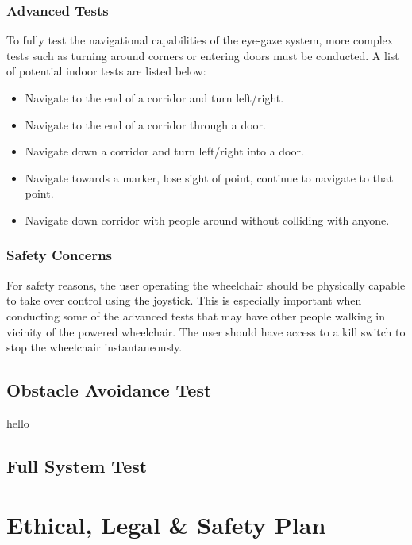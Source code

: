 \documentclass[12pt,a4paper]{report}
\begin{document}
\subsection{Advanced Tests}
To fully test the navigational capabilities of the eye-gaze system, more complex tests such as turning around corners or entering doors must be conducted. A list of potential indoor tests are listed below:

\begin{itemize}
	\item Navigate to the end of a corridor and turn left/right.
	\item Navigate to the end of a corridor through a door.
	\item Navigate down a corridor and turn left/right into a door.
	\item Navigate towards a marker, lose sight of point, continue to navigate to that point.
	\item Navigate down corridor with people around without colliding with anyone.
\end{itemize}

\subsection{Safety Concerns}
For safety reasons, the user operating the wheelchair should be physically capable to take over control using the joystick. This is especially important when conducting some of the advanced tests that may have other people walking in vicinity of the powered wheelchair. The user should have access to a kill switch to stop the wheelchair instantaneously.



\section{Obstacle Avoidance Test}
hello
\section{Full System Test}


\newpage
\chapter{Ethical, Legal \& Safety Plan}

\newpage



\newpage
\end{document}
